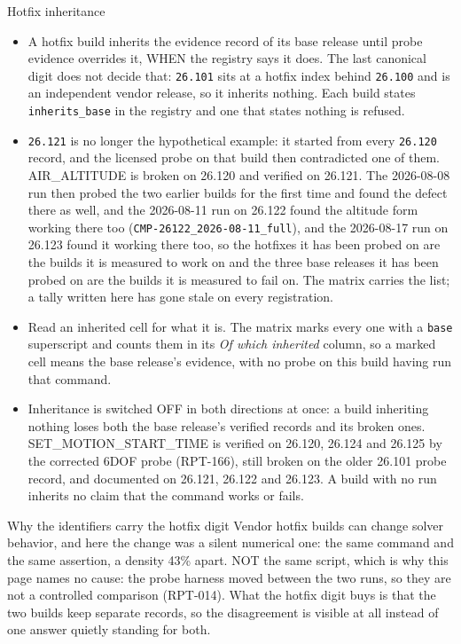 \documentclass[aspectratio=169,10pt]{beamer}
\newcommand{\code}[1]{\texttt{\small #1}}
\begin{document}
\begin{frame}[allowframebreaks]{Hotfix inheritance}
  \begin{itemize}
    \item A hotfix build inherits the evidence record of its base release until probe evidence overrides it, WHEN the registry says it does. The last canonical digit does not decide that: \code{26.101} sits at a hotfix index behind \code{26.100} and is an independent vendor release, so it inherits nothing. Each build states \code{inherits\_base} in the registry and one that states nothing is refused.
    \item \code{26.121} is no longer the hypothetical example: it started from every \code{26.120} record, and the licensed probe on that build then contradicted one of them. AIR\_ALTITUDE is {\color{statusred}broken} on 26.120 and {\color{statusblue}verified} on 26.121. The 2026-08-08 run then probed the two earlier builds for the first time and found the defect there as well, and the 2026-08-11 run on 26.122 found the altitude form working there too (\code{CMP-26122\_2026-08-11\_full}), and the 2026-08-17 run on 26.123 found it working there too, so the hotfixes it has been probed on are the builds it is measured to work on and the three base releases it has been probed on are the builds it is measured to fail on. The matrix carries the list; a tally written here has gone stale on every registration.
      \item Read an inherited cell for what it is. The matrix marks every one with a \texttt{base} superscript and counts them in its \emph{Of which inherited} column, so a marked cell means the base release's evidence, with no probe on this build having run that command.
    \item Inheritance is switched OFF in both directions at once: a build inheriting nothing loses both the base release's verified records and its broken ones. SET\_MOTION\_START\_TIME is verified on 26.120, 26.124 and 26.125 by the corrected 6DOF probe (RPT-166), still broken on the older 26.101 probe record, and documented on 26.121, 26.122 and 26.123. A build with no run inherits no claim that the command works or fails.
  \end{itemize}
  \begin{block}{Why the identifiers carry the hotfix digit}
    Vendor hotfix builds can change solver behavior, and here the change was a silent numerical one: the same command and the same assertion, a density 43\% apart. NOT the same script, which is why this page names no cause: the probe harness moved between the two runs, so they are not a controlled comparison (RPT-014). What the hotfix digit buys is that the two builds keep separate records, so the disagreement is visible at all instead of one answer quietly standing for both.
  \end{block}
\end{frame}
\end{document}
